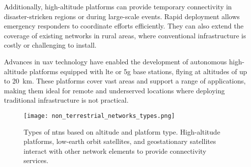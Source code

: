 Additionally, high-altitude platforms can provide temporary connectivity in disaster-stricken regions or during large-scale events. Rapid deployment allows emergency responders to coordinate efforts efficiently. They can also extend the coverage of existing networks in rural areas, where conventional infrastructure is costly or challenging to install.

Advances in \gls{uav} technology have enabled the development of autonomous high-altitude platforms equipped with \gls{lte} or \gls{5g} base stations, flying at altitudes of up to \SI{20}{\kilo\meter}. These platforms cover vast areas and support a range of applications, making them ideal for remote and underserved locations where deploying traditional infrastructure is not practical.

\begin{figure}
  \texttt{[image: non\_terrestrial\_networks\_types.png]}
  \caption{Types of \glspl{ntn} based on altitude and platform type. High-altitude platforms, low-earth orbit satellites, and geostationary satellites interact with other network elements to provide connectivity services. \autocite{alertifyAirbusNTT}}
  \label{fig:ntn_types}
\end{figure}
